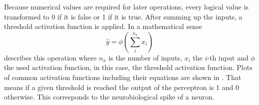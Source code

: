 Because numerical values are required for later operations, every logical value is transformed to 0 if it is false or 1 if it is true.
After summing up the inputs, a threshold activation function is applied.
In a mathematical sense
\begin{equation}
	\label{eq:neuron-mcculloch}
	\hat{y} = \phi \left( \sum_{i}^{n_x} x_i \right)
\end{equation}
describes this operation where $n_x$ is the number of inputs, $x_i$ the $i$-th input and $\phi$ the used activation function, in this case, the threshold activation function.
Plots of common activation functions including their equations are shown in .
That means if a given threshold is reached the output of the perceptron is 1 and 0 otherwise.
This corresponds to the neurobiological spike of a neuron.

